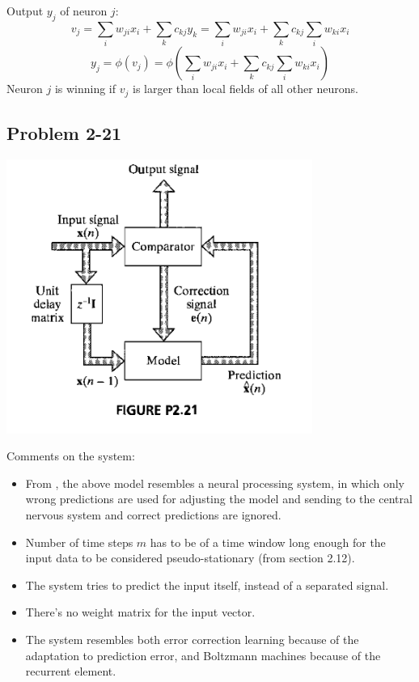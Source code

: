 \documentclass[paper=a4, fontsize=11pt]{scrartcl} %
\begin{document}
    Output $y_j$ of neuron $j$:
    \[ v_j = \sum_i w_{ji} x_i + \sum_k c_{kj} y_k = \sum_i w_{ji} x_i + \sum_k c_{kj} \sum_i w_{ki} x_i \]
    \[ y_j = \phi(v_j) = \phi \left( \sum_i w_{ji} x_i + \sum_k c_{kj} \sum_i w_{ki} x_i \right) \]
    Neuron $j$ is winning if $v_j$ is larger than local fields of all other neurons.

    \subsection*{Problem 2-21}

    \begin{center}
        \setlength{\fboxsep}{0.5pt} %
        \setlength{\fboxrule}{0.5pt} %
        \includegraphics[width=10.0cm]{../images/Haykin-NN-figurep2-21.png} %
    \end{center}

    Comments on the system:
    \begin{itemize}
        \item From \cite{mead1990}, the above model resembles a neural processing system, in which only wrong predictions are used for adjusting the model and sending to the central nervous system and correct predictions are ignored.
        \item Number of time steps $m$ has to be of a time window long enough for the input data to be considered pseudo-stationary (from section 2.12).
        \item The system tries to predict the input itself, instead of a separated signal.
        \item There's no weight matrix for the input vector.
        \item The system resembles both error correction learning because of the adaptation to prediction error, and Boltzmann machines because of the recurrent element.
    \end{itemize}
\end{document}
